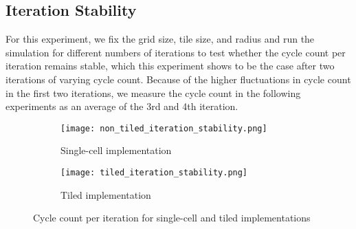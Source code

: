 \subsection{Iteration Stability}
\label{sec:stability_of_cycle_count_per_iteration}
For this experiment, we fix the grid size, tile size, and radius and run the simulation for different numbers of iterations to test whether the cycle count per iteration remains stable, which this experiment shows to be the case after two iterations of varying cycle count.
Because of the higher fluctuations in cycle count in the first two iterations, we measure the cycle count in the following experiments as an average of the 3rd and 4th iteration.
\begin{figure}[h]
    \centering
    \begin{subfigure}[b]{0.48\textwidth}
        \centering
        \texttt{[image: non\_tiled\_iteration\_stability.png]}
        \caption{Single-cell implementation}
        \label{fig:non_tiled_iteration_stability}
    \end{subfigure}
    \hfill
    \begin{subfigure}[b]{0.48\textwidth}
        \centering
        \texttt{[image: tiled\_iteration\_stability.png]}
        \caption{Tiled implementation}
        \label{fig:tiled_iteration_stability}
    \end{subfigure}
    \caption{Cycle count per iteration for single-cell and tiled implementations}
    \label{fig:iteration_stability}
\end{figure}

